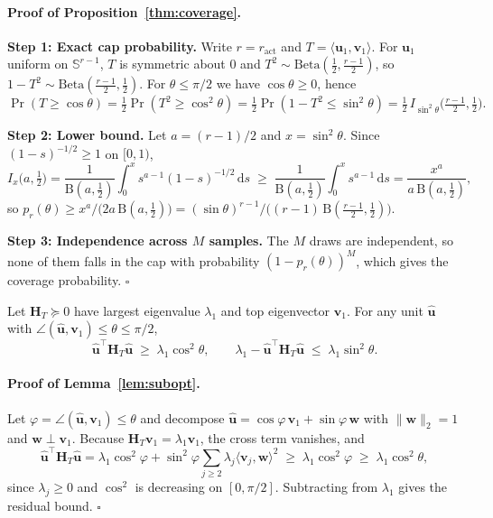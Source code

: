 {\paragraph{Proof of Proposition~\ref{thm:coverage}.}
\textbf{Step 1: Exact cap probability.}
Write $r=r_{\mathrm{act}}$ and $T=\langle\boldsymbol u_1,\boldsymbol v_1\rangle$. For $\boldsymbol u_1$ uniform on $\mathbb S^{r-1}$, $T$ is symmetric about $0$ and $T^2\sim\mathrm{Beta}(\frac12,\frac{r-1}{2})$, so $1-T^2\sim\mathrm{Beta}(\frac{r-1}{2},\frac12)$. For $\theta\le\pi/2$ we have $\cos\theta\ge0$, hence
\[
\Pr(T\ge\cos\theta)=\tfrac12\Pr(T^2\ge\cos^2\theta)=\tfrac12\Pr(1-T^2\le\sin^2\theta)=\tfrac12\,I_{\sin^2\theta}\big(\tfrac{r-1}{2},\tfrac12\big).
\]

\textbf{Step 2: Lower bound.}
Let $a=(r-1)/2$ and $x=\sin^2\theta$. Since $(1-s)^{-1/2}\ge1$ on $[0,1)$,
\[
I_x\big(a,\tfrac12\big)=\frac{1}{\mathrm B(a,\frac12)}\int_0^x s^{a-1}(1-s)^{-1/2}\,\mathrm ds\;\ge\;\frac{1}{\mathrm B(a,\frac12)}\int_0^x s^{a-1}\,\mathrm ds=\frac{x^{a}}{a\,\mathrm B(a,\frac12)},
\]
so $p_r(\theta)\ge x^{a}/\big(2a\,\mathrm B(a,\frac12)\big)=(\sin\theta)^{r-1}/\big((r-1)\,\mathrm B(\frac{r-1}{2},\frac12)\big)$.

\textbf{Step 3: Independence across $M$ samples.}
The $M$ draws are independent, so none of them falls in the cap with probability $(1-p_r(\theta))^M$, which gives the coverage probability.
\hfill$\square$

\bigskip
\begin{lemma}\label{lem:subopt}
Let $\mathbf H_T\succeq 0$ have largest eigenvalue $\lambda_1$ and top eigenvector $\boldsymbol v_1$. For any unit $\boldsymbol{\hat u}$ with $\angle(\boldsymbol{\hat u},\boldsymbol v_1)\le\theta\le\pi/2$,
\[
\boldsymbol{\hat u}^{\!\top}\mathbf{H}_T\boldsymbol{\hat u} \;\ge\; \lambda_1 \cos^2\!\theta,
\qquad
\lambda_1 - \boldsymbol{\hat u}^{\!\top}\mathbf{H}_T\boldsymbol{\hat u} \;\le\; \lambda_1 \sin^2\!\theta.
\]
\end{lemma}

\paragraph{Proof of Lemma~\ref{lem:subopt}.}
Let $\varphi=\angle(\boldsymbol{\hat u},\boldsymbol v_1)\le\theta$ and decompose $\boldsymbol{\hat u}=\cos\varphi\,\boldsymbol{v}_1+\sin\varphi\,\boldsymbol{w}$ with $\|\boldsymbol{w}\|_2=1$ and $\boldsymbol{w}\perp\boldsymbol{v}_1$. Because $\mathbf H_T\boldsymbol v_1=\lambda_1\boldsymbol v_1$, the cross term vanishes, and
\[
\boldsymbol{\hat u}^{\!\top}\mathbf{H}_T\boldsymbol{\hat u}
=
\lambda_1\cos^2\!\varphi
+
\sin^2\!\varphi\sum_{j\ge 2}\lambda_j \langle \boldsymbol{v}_j,\boldsymbol{w}\rangle^2
\;\ge\;
\lambda_1\cos^2\!\varphi\;\ge\;\lambda_1\cos^2\!\theta,
\]
since $\lambda_j\ge 0$ and $\cos^2$ is decreasing on $[0,\pi/2]$. Subtracting from $\lambda_1$ gives the residual bound.
\hfill$\square$

}
